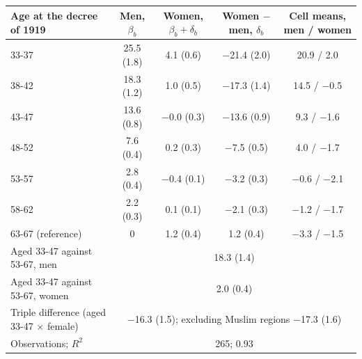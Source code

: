 \begin{tabular}{lcccc}
\toprule
Age at the decree of 1919 & Men, $\beta_b$ & Women, $\beta_b+\delta_b$ & Women $-$ men, $\delta_b$ & Cell means, men / women \\
\midrule
33-37 & 25.5 (1.8) & 4.1 (0.6) & $-$21.4 (2.0) & 20.9 / 2.0 \\
38-42 & 18.3 (1.2) & 1.0 (0.5) & $-$17.3 (1.4) & 14.5 / $-$0.5 \\
43-47 & 13.6 (0.8) & $-$0.0 (0.3) & $-$13.6 (0.9) & 9.3 / $-$1.6 \\
48-52 & 7.6 (0.4) & 0.2 (0.3) & $-$7.5 (0.5) & 4.0 / $-$1.7 \\
53-57 & 2.8 (0.4) & $-$0.4 (0.1) & $-$3.2 (0.3) & $-$0.6 / $-$2.1 \\
58-62 & 2.2 (0.3) & 0.1 (0.1) & $-$2.1 (0.3) & $-$1.2 / $-$1.7 \\
63-67 (reference) & 0 & 1.2 (0.4) & 1.2 (0.4) & $-$3.3 / $-$1.5 \\
\midrule
Aged 33-47 against 53-67, men & \multicolumn{4}{c}{18.3 (1.4)} \\
Aged 33-47 against 53-67, women & \multicolumn{4}{c}{2.0 (0.4)} \\
Triple difference (aged 33-47 $\times$ female) & \multicolumn{4}{c}{$-$16.3 (1.5); excluding Muslim regions $-$17.3 (1.6)} \\
Observations; $R^2$ & \multicolumn{4}{c}{265; 0.93} \\
\bottomrule
\end{tabular}

